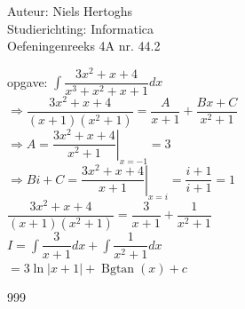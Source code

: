 \documentclass[a4paper]{article}
\begin{document}
  
\noindent \large Auteur: Niels Hertoghs \\
\noindent \large Studierichting: Informatica\\
\noindent \large Oefeningenreeks 4A nr. 44.2\\

\medskip

\normalsize

opgave: $\displaystyle\int \dfrac{3x^2+x+4}{x^3+x^2+x+1}dx$\\

$\Rightarrow \dfrac{3x^2+x+4}{(x+1)(x^2+1)} = \dfrac{A}{x+1} + \dfrac{Bx + C}{x^2 + 1}$\\

$\Rightarrow A = \left .\dfrac{3x^2+x+4}{x^2 + 1} \right|_{x = -1} = 3$\\

$\Rightarrow Bi + C = \left .\dfrac{3x^2+x+4}{x+1} \right|_{x = i} = \dfrac{i+1}{i+1} = 1$\\

$\dfrac{3x^2+x+4}{(x+1)(x^2+1)} = \dfrac{3}{x+1} + \dfrac{1}{x^2 + 1}$\\

$I = \displaystyle\int \dfrac{3}{x+1}dx + \displaystyle\int \dfrac{1}{x^2 + 1}dx$\\

$= 3 \ln|x+1| + \operatorname{Bgtan}(x) + c$\\

\begin{thebibliography}{999}
\end{thebibliography}
\end{document}
